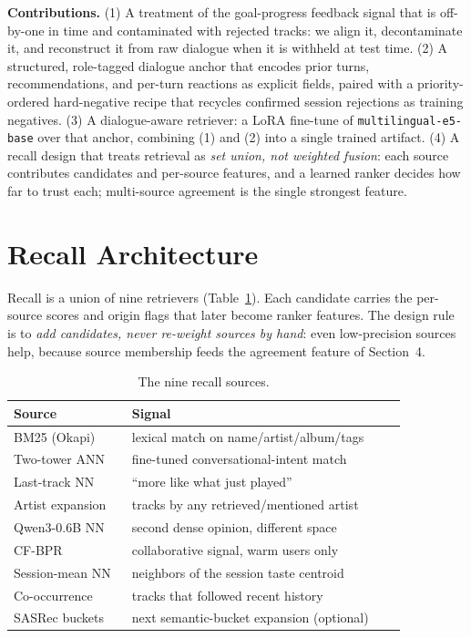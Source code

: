 \documentclass[sigconf]{acmart}
\begin{document}
\textbf{Contributions.} (1) A treatment of the goal-progress feedback signal that is
off-by-one in time and contaminated with rejected tracks: we align it, decontaminate
it, and reconstruct it from raw dialogue when it is withheld at test time. (2) A
structured, role-tagged dialogue anchor that encodes prior turns, recommendations,
and per-turn reactions as explicit fields, paired with a priority-ordered
hard-negative recipe that recycles confirmed session rejections as training
negatives. (3) A dialogue-aware retriever: a LoRA fine-tune of
\texttt{multilingual-e5-base} over that anchor, combining (1) and (2) into a single
trained artifact. (4) A recall design that treats retrieval as \emph{set union, not
weighted fusion}: each source contributes candidates and per-source features, and a
learned ranker decides how far to trust each; multi-source agreement is the single
strongest feature.

\section{Recall Architecture}

Recall is a union of nine retrievers (Table~\ref{tab:sources}). Each candidate carries the
per-source scores and origin flags that later become ranker features. The design
rule is to \emph{add candidates, never re-weight sources by hand}: even low-precision
sources help, because source membership feeds the agreement feature of Section~4.

\begin{table}[t]
  \caption{The nine recall sources.}
  \label{tab:sources}
  \small
  \renewcommand{\arraystretch}{1.15}
  \setlength{\tabcolsep}{4pt}
  \begin{tabular}{@{}p{0.28\linewidth} p{0.65\linewidth}@{}}
    \toprule
    \textbf{Source} & \textbf{Signal} \\
    \midrule
    BM25 (Okapi) & lexical match on name/artist/album/tags \\
    Two-tower ANN & fine-tuned conversational-intent match \\
    Last-track NN & ``more like what just played'' \\
    Artist expansion & tracks by any retrieved/mentioned artist \\
    Qwen3-0.6B NN & second dense opinion, different space \\
    CF-BPR & collaborative signal, warm users only \\
    Session-mean NN & neighbors of the session taste centroid \\
    Co-occurrence & tracks that followed recent history \\
    SASRec buckets & next semantic-bucket expansion (optional) \\
    \bottomrule
  \end{tabular}
\end{table}
\end{document}
